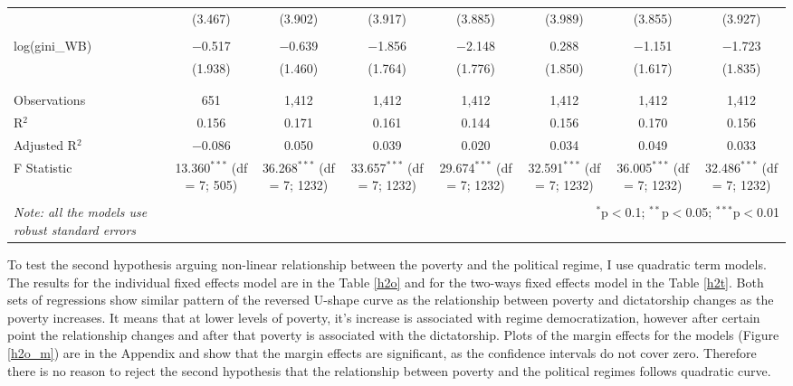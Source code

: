\documentclass[a4paper, 12pt]{article}
\begin{document}
\begin{table}[!htbp]
{\begin{tabular}{@{\extracolsep{5pt}}lccccccc}
  & (3.467) & (3.902) & (3.917) & (3.885) & (3.989) & (3.855) & (3.927) \\ 
  & & & & & & & \\ 
 log(gini\_WB) & $-$0.517 & $-$0.639 & $-$1.856 & $-$2.148 & 0.288 & $-$1.151 & $-$1.723 \\ 
  & (1.938) & (1.460) & (1.764) & (1.776) & (1.850) & (1.617) & (1.835) \\ 
  & & & & & & & \\ 
\hline \\[-1.8ex] 
Observations & 651 & 1,412 & 1,412 & 1,412 & 1,412 & 1,412 & 1,412 \\ 
R$^{2}$ & 0.156 & 0.171 & 0.161 & 0.144 & 0.156 & 0.170 & 0.156 \\ 
Adjusted R$^{2}$ & $-$0.086 & 0.050 & 0.039 & 0.020 & 0.034 & 0.049 & 0.033 \\ 
F Statistic & 13.360$^{***}$ (df = 7; 505) & 36.268$^{***}$ (df = 7; 1232) & 33.657$^{***}$ (df = 7; 1232) & 29.674$^{***}$ (df = 7; 1232) & 32.591$^{***}$ (df = 7; 1232) & 36.005$^{***}$ (df = 7; 1232) & 32.486$^{***}$ (df = 7; 1232) \\ 
\hline 
\hline \\[-1.8ex] 
\textit{Note: all the models use robust standard errors}  & \multicolumn{7}{r}{$^{*}$p$<$0.1; $^{**}$p$<$0.05; $^{***}$p$<$0.01} \\ 
\end{tabular}
}
\end{table}
    
    \noindent To test the second hypothesis arguing non-linear relationship between the poverty and the political regime, I use quadratic term models. The results for the individual fixed effects model are in the Table \ref{h2o} and for the two-ways fixed effects model in the Table \ref{h2t}. Both sets of regressions show similar pattern of the reversed U-shape curve as the relationship between poverty and dictatorship changes as the poverty increases. It means that at lower levels of poverty, it's increase is associated with regime democratization, however after certain point the relationship changes and after that poverty is associated with the dictatorship. Plots of the margin effects for the models (Figure \ref{h2o_m}) are in the Appendix and show that the margin effects are significant, as the confidence intervals do not cover zero. Therefore there is no reason to reject the second hypothesis that the relationship between poverty and the political regimes follows quadratic curve.
    
\end{document}
